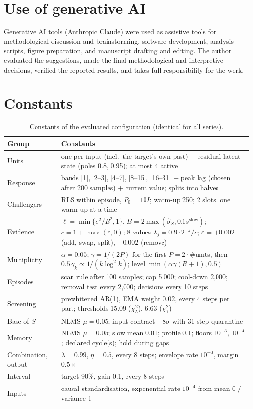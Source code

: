 \documentclass[11pt]{article}
\theoremstyle{remark}
\begin{document}
\section*{Use of generative AI}
Generative AI tools (Anthropic Claude) were used as assistive tools for methodological discussion and brainstorming, software development, analysis scripts, figure preparation, and manuscript drafting and editing. The author evaluated the suggestions, made the final methodological and interpretive decisions, verified the reported results, and takes full responsibility for the work.




\clearpage
\appendix
\section{Constants}\label{sec:params}
\begin{table}[h]
\centering\small
\caption{Constants of the evaluated configuration (identical for all series).}\label{tab:params}
\begin{tabularx}{\linewidth}{lX}
\toprule
Group & Constants\\
\midrule
Units & one per input (incl.\ the target's own past) + residual latent state (poles 0.8, 0.95); at most 4 active\\
Response & bands [1], [2--3], [4--7], [8--15], [16--31] + peak lag (chosen after 200 samples) + current value; splits into halves\\
Challengers & RLS within episode, $P_0=10I$; warm-up 250; 2 slots; one warm-up at a time\\
Evidence & $\ell=\min\{e^2/B^2,1\}$, $B=2\max(\hat\sigma_S,0.1 s^{\mathrm{slow}})$; $c=1+\max(\varepsilon,0)$; 8 values $\lambda_j=0.9\cdot2^{-j}/c$; $\varepsilon=+0.002$ (add, swap, split), $-0.002$ (remove)\\
Multiplicity & $\alpha=0.05$; $\gamma=1/(2P)$ for the first $P=2\cdot\#$units, then $0.5\,\gamma_k\propto 1/(k\log^2k)$; level $\min(\alpha\gamma(R+1),0.5)$\\
Episodes & scan rule after 100 samples; cap 5{,}000; cool-down 2{,}000; removal test every 2{,}000; decisions every 10 steps\\
Screening & prewhitened AR(1), EMA weight 0.02, every 4 steps per part; thresholds 15.09 ($\chi^2_5$), 6.63 ($\chi^2_1$)\\
Base of $S$ & NLMS $\mu=0.05$; input contract $\pm8\sigma$ with 31-step quarantine\\
Memory & NLMS $\mu=0.05$; slow mean 0.01; profile 0.1; floors $10^{-3}$, $10^{-4}$; declared cycle(s); hold during gaps\\
Combination, output & $\lambda=0.99$, $\eta=0.5$, every 8 steps; envelope rate $10^{-3}$, margin $0.5\times$\\
Interval & target 90\%, gain 0.1, every 8 steps\\
Inputs & causal standardisation, exponential rate $10^{-4}$ from mean 0 / variance 1\\
\bottomrule
\end{tabularx}
\end{table}
\end{document}
